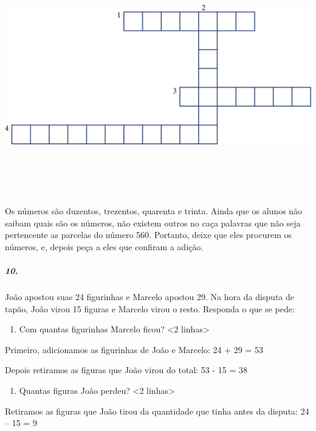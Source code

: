 \includegraphics[width=6.04167in,height=4.07813in]{media/image38.png}

Os números são duzentos, trezentos, quarenta e trinta. Ainda que os
alunos não saibam quais são os números, não existem outros no caça
palavras que não seja pertencente as parcelas do número 560. Portanto,
deixe que eles procurem os números, e, depois peça a eles que confiram a
adição.

\subparagraph{10.}\label{section-23}

João apostou suas 24 figurinhas e Marcelo apostou 29. Na hora da disputa
de tapão, João virou 15 figuras e Marcelo virou o resto. Responda o que
se pede:

\begin{enumerate}
\def\labelenumi{\Alph{enumi})}
\item
  Com quantas figurinhas Marcelo ficou? \textless{}2
  linhas\textgreater{}
\end{enumerate}

Primeiro, adicionamos as figurinhas de João e Marcelo: 24 + 29 = 53

Depois retiramos as figuras que João virou do total: 53 - 15 = 38

\begin{enumerate}
\def\labelenumi{\Alph{enumi})}
\item
  Quantas figuras João perdeu? \textless{}2 linhas\textgreater{}
\end{enumerate}

Retiramos as figuras que João tirou da quantidade que tinha antes da
disputa: 24 -- 15 = 9


